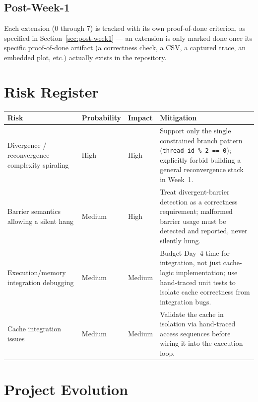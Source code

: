 \documentclass[11pt]{article}
\begin{document}
\subsection{Post-Week-1}

Each extension (0 through 7) is tracked with its own proof-of-done
criterion, as specified in Section~\ref{sec:post-week1} --- an extension is only marked done
once its specific proof-of-done artifact (a correctness check, a CSV, a
captured trace, an embedded plot, etc.) actually exists in the repository.

\section{Risk Register}

\begin{longtable}{@{}p{3.6cm}p{2cm}p{2cm}p{6cm}@{}}
\toprule
\textbf{Risk} & \textbf{Probability} & \textbf{Impact} & \textbf{Mitigation} \\
\midrule
\endhead
Divergence / reconvergence complexity spiraling & High & High & Support
only the single constrained branch pattern (\texttt{thread\_id \% 2 == 0});
explicitly forbid building a general reconvergence stack in Week~1. \\
Barrier semantics allowing a silent hang & Medium & High & Treat
divergent-barrier detection as a correctness requirement; malformed
barrier usage must be detected and reported, never silently hung. \\
Execution/memory integration debugging & Medium & Medium & Budget Day~4
time for integration, not just cache-logic implementation; use hand-traced
unit tests to isolate cache correctness from integration bugs. \\
Cache integration issues & Medium & Medium & Validate the cache in
isolation via hand-traced access sequences before wiring it into the
execution loop. \\
\bottomrule
\end{longtable}

\section{Project Evolution}
\end{document}
